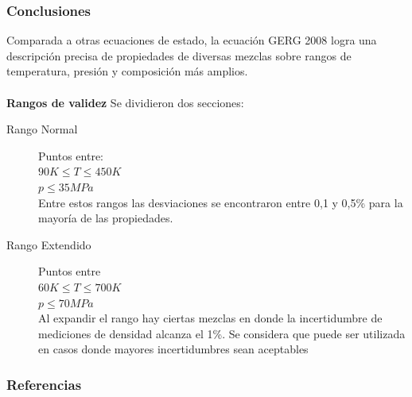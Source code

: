 \documentclass[aspectratio=1610,multi,rgb]{beamer}
\newcommand{\titleframe}[1]{
\begin{frame} \null\hfill\huge{\shadowbox{#1}}\hspace{1cm} \end{frame}}
\begin{document}
\begin{frame}
	\frametitle{Conclusiones}
	Comparada a otras ecuaciones de estado, la ecuación GERG 2008 logra una
	descripción precisa de propiedades de diversas mezclas sobre rangos de
	temperatura, presión y composición más amplios. \\~\\

	\textbf{Rangos de validez}
	Se dividieron dos secciones:
	\begin{description}
	\item[Rango Normal] Puntos entre:\\
		$90 K \le T \le 450 K$\\
		$p \le 35 MPa$\\ 
		Entre estos rangos las desviaciones se encontraron
		entre 0,1 y 0,5\% para la mayoría de las propiedades.
	\item[Rango Extendido] Puntos entre \\
		$60 K \le T \le 700 K$\\ 
		$p \le 70 MPa$\\
		Al expandir el rango hay ciertas 
		mezclas en donde la incertidumbre de mediciones de 
		densidad alcanza el 1\%. Se considera que puede ser
		utilizada en casos donde mayores incertidumbres sean
		aceptables
	\end{description}
\end{frame}

\begin{frame}[c]
	\frametitle{Referencias}
	\printbibliography
\end{frame}

\titleframe{Muchas gracias!}
\end{document}
